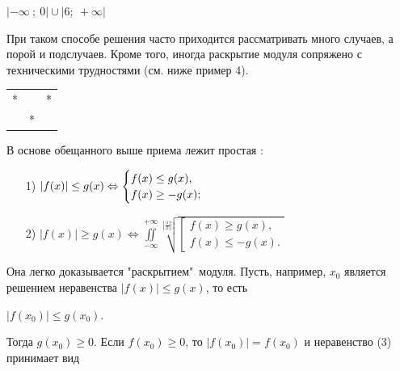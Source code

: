 $|-\infty\ ;\ 0|\cup|6;\ +\infty|$

При таком способе решения часто приходится рассматривать много случаев, а порой и подслучаев. Кроме того, иногда раскрытие модуля сопряжено с техническими трудностями (см. ниже пример 4).

\begin{center}
\vspace*{-1mm}
\begin{tabular}{ l l l }
 * &   & * \\ 
   & * &   \\ 
\end{tabular}
\vspace*{-\baselineskip}
\end{center}

В основе обещанного выше приема лежит простая :

\begin{enumerate}


\item[1)]
$|f(x)|\leq g(x) \Leftrightarrow 
    \begin{cases}
        f(x)\leq g(x),\\
        f(x)\geq -g(x);
    \end{cases}\\$
\item[2)]
$|f(x)|\geqslant g(x) \Leftrightarrow 
    \iint\limits_{-\infty}^{+\infty} \sqrt[\left|\frac{|1|}{|2|}\right|]{
    \left[
        \begin{gathered}
            f(x)\geq g(x),\\
            f(x)\leq -g(x).
        \end{gathered}
    \right. }$
\end{enumerate}
\noindent Она легко доказывается "раскрытием"\ модуля. Пусть, например, $x_0$ является решением неравенства $|f(x)|\leq g(x)$, то есть

\hfill $|f(x_0)|\leq g(x_0)$. \hfill {}

\noindent Тогда $g(x_0)\geq 0$. Если  $f(x_0)\geq 0$, то $|f(x_0)| = f(x_0)$ и неравенство (3) принимает вид




